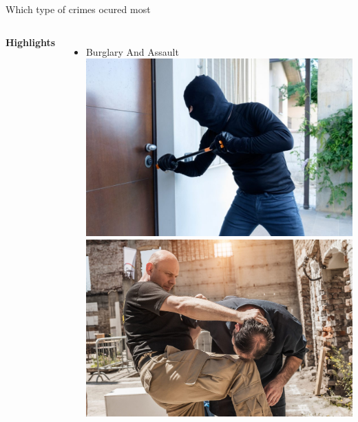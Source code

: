 \documentclass{beamer}\usepackage[]{graphicx}\usepackage[]{xcolor}
\makeatletter
\def\maxwidth{ %
  \ifdim\Gin@nat@width>\linewidth
    \linewidth
  \else
    \Gin@nat@width
  \fi
}
\newenvironment{knitrout}{}{} %
\makeatother
\begin{document}
\begin{frame}[fragile]{Which type of crimes ocured most}
\begin{columns}
\textbf{Highlights}
\begin{itemize}
\item Burglary And Assault
\begin{knitrout}
\color{fgcolor}
\includegraphics[width=\maxwidth]{figure/bur.jpg} 
\end{knitrout}
\begin{knitrout}
\color{fgcolor}
\includegraphics[width=\maxwidth]{figure/as.jpg} 
\end{knitrout}
\end{itemize}

\end{columns}
\end{frame}
\end{document}
